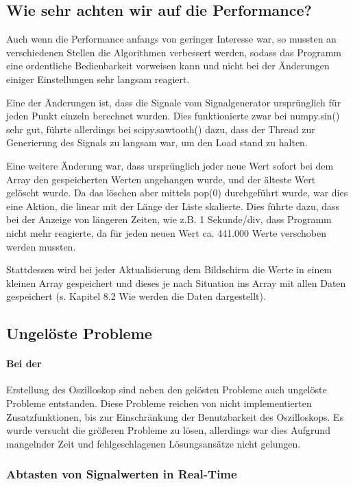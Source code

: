 \documentclass{article}
\begin{document}
\subsection{Wie sehr achten wir auf die Performance?}
Auch wenn die Performance anfangs von geringer Interesse war, so mussten an verschiedenen Stellen die Algorithmen verbessert werden, sodass das Programm eine ordentliche Bedienbarkeit vorweisen kann und nicht bei der Änderungen einiger Einstellungen sehr langsam reagiert.

Eine der Änderungen ist, dass die Signale vom Signalgenerator ursprünglich für jeden Punkt einzeln berechnet wurden. Dies funktionierte zwar bei numpy.sin() sehr gut, führte allerdings bei scipy.sawtooth() dazu, dass der Thread zur Generierung des Signals zu langsam war, um den Load stand zu halten.

Eine weitere Änderung war, dass ursprünglich jeder neue Wert sofort bei dem Array den gespeicherten Werten angehangen wurde, und der älteste Wert gelöscht wurde. Da das löschen aber mittels  pop(0) durchgeführt wurde, war dies eine Aktion, die linear mit der Länge der Liste skalierte. Dies führte dazu, dass bei der Anzeige von längeren Zeiten, wie z.B. 1 Sekunde/div, dass Programm nicht mehr reagierte, da für jeden neuen Wert ca. 441.000 Werte verschoben werden mussten.

Stattdessen wird bei jeder Aktualisierung dem Bildschirm die Werte in einem kleinen Array gespeichert und dieses je nach Situation ins Array mit allen Daten gespeichert (s. Kapitel 8.2 Wie werden die Daten dargestellt).


\subsection{Ungelöste Probleme}
\paragraph{Bei der}
Erstellung des Oszilloskop sind neben den gelösten Probleme auch ungelöste Probleme entstanden. Diese Probleme reichen von nicht implementierten Zusatzfunktionen, bis zur Einschränkung der Benutzbarkeit des Oszilloskops. Es wurde versucht die größeren Probleme zu lösen, allerdings war dies Aufgrund mangelnder Zeit und fehlgeschlagenen Lösungsansätze nicht gelungen.

\subsubsection{Abtasten von Signalwerten in Real-Time}
\end{document}
